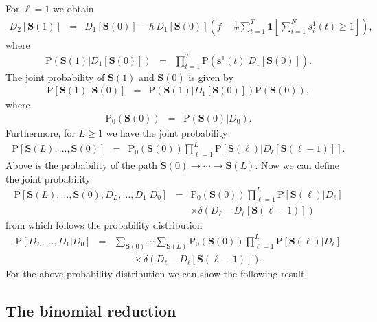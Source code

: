 \documentclass[10pt]{iopart}
\newcommand{\1}{\mathbf{1}}
\newcommand{\Prob}{\mathrm{P}}
\newcommand{\sv}{\ensuremath{\mathbf{s}}}
\newcommand{\Sm}{\ensuremath{\mathbf{S}}}
\begin{document}
For $\ell=1$ we obtain 
%
\begin{eqnarray}
%
    D_{2}[\Sm(1)]&=& D_{1}[\Sm(0)]-h \,D_{1}[\Sm(0)]\left(\!f-\frac{1}{T}\sum_{t=1}^T\1\left[\sum_{i=1}^N s^1_i(t)\ge1\right]\right),
\end{eqnarray}
%
where
%
\begin{eqnarray}
\Prob\left(\Sm(1)\vert D_{1}[\Sm(0)]\right)&=&\prod_{t=1}^T\Prob(\sv^1(t)\vert D_{1}[\Sm(0)]).
\end{eqnarray}
%
The joint probability of $\Sm(1)$ and $\Sm(0)$ is given by 
%
\begin{eqnarray}
\Prob\left[\Sm(1),\Sm(0)\right]&=&\Prob\left(\Sm(1)\vert D_{1}[\Sm(0)]\right)\Prob(\Sm(0)),
\end{eqnarray}
%
where 
%
\begin{eqnarray}
\Prob_0(\Sm(0))&=&\Prob\left(\Sm(0)\vert D_0\right).
\end{eqnarray}
%
Furthermore, for $L\ge1$ we have the joint probability
%
\begin{eqnarray}
\Prob\left[\Sm(L),\ldots,\Sm(0)\right]&=&\Prob_0(\Sm(0))\prod_{\ell=1}^L\Prob\left[\Sm(\ell)\vert D_{\ell}[\Sm(\ell-1)]\right]\label{def:prob-path}.
\end{eqnarray}
%
Above is the probability of the path $\Sm(0)\to\cdots\to\Sm(L)$. Now we can define the joint probability 
%
\begin{eqnarray}
\Prob\left[\Sm(L),\ldots,\Sm(0);D_{L},\ldots,D_{1}\vert D_{0}\right]&=&\Prob_0(\Sm(0))\prod_{\ell=1}^L\Prob\left[\Sm(\ell)\vert D_{\ell}\right]\nonumber\\
&&\times\delta\left(D_{\ell}-D_{\ell}[\Sm(\ell-1)]\right)\label{def:prob-path-joint}
\end{eqnarray}
%
from which follows the probability distribution 
%
\begin{eqnarray}
\Prob\left[D_{L},\ldots,D_{1}\vert D_{0}\right]&=&\sum_{\Sm(0)}\cdots\sum_{\Sm(L)}\Prob_0(\Sm(0))\prod_{\ell=1}^L\Prob\left[\Sm(\ell)\vert D_{\ell}\right]\nonumber\\
&&~~~~~~~~~\times\delta\left(D_{\ell}-D_{\ell}[\Sm(\ell-1)]\right)\label{def:prob-path-D}.
\end{eqnarray}
%
For the above probability distribution  we can show the following result. 

\subsection{The binomial reduction}
\end{document}
